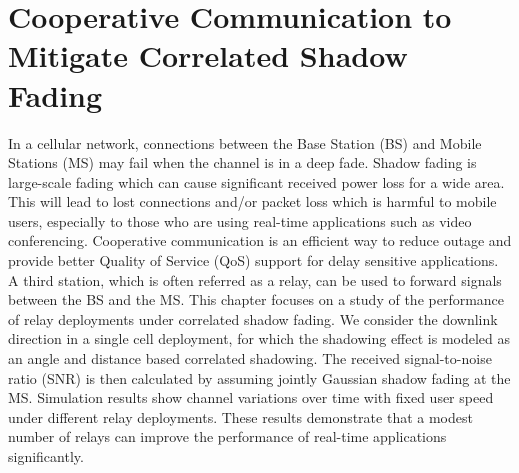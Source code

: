 \chapter{Cooperative Communication to Mitigate Correlated Shadow Fading}\label{ch:CoopComm}
\par In a cellular network, connections between the Base Station (BS) and Mobile Stations (MS) may fail when the channel is in a deep fade. Shadow fading is large-scale fading which can cause significant received power loss for a wide area. This will lead to lost connections and/or packet loss which is harmful to mobile users, especially to those who are using real-time applications such as video conferencing. Cooperative communication is an efficient way to reduce outage and provide better Quality of Service (QoS) support for delay sensitive applications. A third station, which is often referred as a relay, can be used to forward signals between  the BS and the MS. This chapter focuses on a study of the performance of relay deployments under correlated shadow fading. We consider the downlink direction in a single cell deployment, for which the shadowing effect is modeled as an angle and distance  based correlated shadowing. The received signal-to-noise ratio (SNR) is then calculated by assuming jointly Gaussian shadow fading at the MS. Simulation results show channel variations over time with fixed user speed under different relay deployments. These results demonstrate that a modest number of relays can improve the performance of real-time applications significantly.
